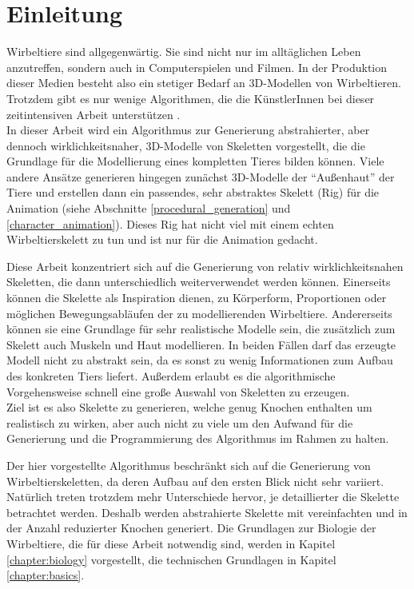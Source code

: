 \chapter{Einleitung}

Wirbeltiere sind allgegenwärtig. Sie sind nicht nur im alltäglichen Leben anzutreffen, sondern auch in Computerspielen und Filmen. In der Produktion dieser Medien besteht also ein stetiger Bedarf an 3D-Modellen von Wirbeltieren.
Trotzdem gibt es nur wenige Algorithmen, die die KünstlerInnen bei dieser zeitintensiven Arbeit unterstützen \cite{PCGSurvey_videoGames}.\\
In dieser Arbeit wird ein Algorithmus zur Generierung abstrahierter, aber dennoch wirklichkeitsnaher, 3D-Modelle von Skeletten vorgestellt, die die Grundlage für die Modellierung eines kompletten Tieres bilden können.
Viele andere Ansätze generieren hingegen zunächst 3D-Modelle der "`Außenhaut"' der Tiere und erstellen dann ein passendes, sehr abstraktes Skelett (Rig) für die Animation (siehe Abschnitte \ref{procedural_generation} und \ref{character_animation}). 
Dieses Rig hat nicht viel mit einem echten Wirbeltierskelett zu tun und ist nur für die Animation gedacht.

Diese Arbeit konzentriert sich auf die Generierung von relativ wirklichkeitsnahen Skeletten, die dann unterschiedlich weiterverwendet werden können.
Einerseits können die Skelette als Inspiration dienen, \zb zu Körperform, Proportionen oder möglichen Bewegungsabläufen der zu modellierenden Wirbeltiere.
Andererseits können sie eine Grundlage für sehr realistische Modelle sein, die zusätzlich zum Skelett auch Muskeln und Haut modellieren.
In beiden Fällen darf das erzeugte Modell nicht zu abstrakt sein, da es sonst zu wenig Informationen zum Aufbau des konkreten Tiers liefert. Außerdem erlaubt es die algorithmische Vorgehensweise schnell eine große Auswahl von Skeletten zu erzeugen.\\
Ziel ist es also Skelette zu generieren, welche genug Knochen enthalten um realistisch zu wirken, aber auch nicht zu viele um den Aufwand für die Generierung und die Programmierung des Algorithmus im Rahmen zu halten.

Der hier vorgestellte Algorithmus beschränkt sich auf die Generierung von Wirbeltierskeletten, da deren Aufbau auf den ersten Blick nicht sehr variiert. Natürlich treten trotzdem mehr Unterschiede hervor, je detaillierter die Skelette betrachtet werden.
Deshalb werden abstrahierte Skelette mit vereinfachten und in der Anzahl reduzierter Knochen generiert. Die Grundlagen zur Biologie der Wirbeltiere, die für diese Arbeit notwendig sind, werden in Kapitel \ref{chapter:biology} vorgestellt, die technischen Grundlagen in Kapitel \ref{chapter:basics}.

